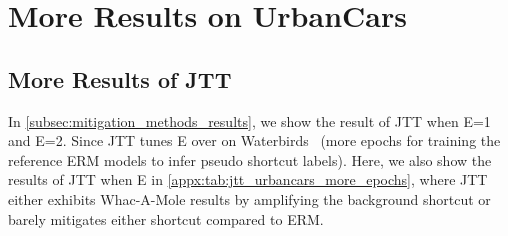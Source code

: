 \documentclass[10pt,twocolumn,letterpaper]{article}
\begin{document}
\section{More Results on UrbanCars}

\subsection{More Results of JTT}
\label{appx:subsec:jtt_more_results}

In \cref{subsec:mitigation_methods_results}, we show the result of JTT when E=1 and E=2. Since JTT tunes E over  on Waterbirds~\cite{sagawa2020Int.Conf.Learn.Represent.Distributionally} (more epochs for training the reference ERM models to infer pseudo shortcut labels). Here, we also show the results of JTT when E  in \cref{appx:tab:jtt_urbancars_more_epochs}, where JTT either exhibits Whac-A-Mole results by amplifying the background shortcut or barely mitigates either shortcut compared to ERM.
\end{document}
